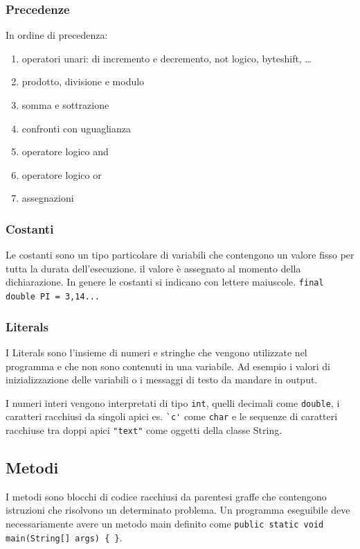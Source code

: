 \documentclass[a4paper]{article}
\begin{document}
\subsubsection*{Precedenze}
In ordine di precedenza:
\begin{enumerate}[topsep=3pt, itemsep=0pt]
	\item operatori unari: di incremento e decremento, not logico, byteshift, \dots
	\item prodotto, divisione e modulo
	\item somma e sottrazione
	\item confronti con uguaglianza
	\item operatore logico and
	\item operatore logico or
	\item assegnazioni
\end{enumerate}

\subsubsection*{Costanti}
Le costanti sono un tipo particolare di variabili che contengono un valore fisso per tutta la durata dell'esecuzione.
il valore è assegnato al momento della dichiarazione. In genere le costanti si indicano con lettere maiuscole.
\verb|final double PI = 3,14...|

\subsubsection*{Literals}
I Literals sono l'insieme di numeri e stringhe che vengono utilizzate nel programma e che non sono contenuti in una variabile.
Ad esempio i valori di inizializzazione delle variabili o i messaggi di testo da mandare in output.

I numeri interi vengono interpretati di tipo \verb|int|, quelli decimali come \verb|double|, i caratteri racchiusi da singoli
apici es. \verb|`c'| come \verb|char| e le sequenze di caratteri racchiuse tra doppi apici \verb|"text"| come oggetti della
classe String.

\newpage


\subsection{Metodi}
I metodi sono blocchi di codice racchiusi da parentesi graffe che contengono istruzioni che risolvono un determinato problema.
Un programma eseguibile deve necessariamente avere un metodo main definito come \verb|public static void main(String[] args) { }|.
\end{document}
